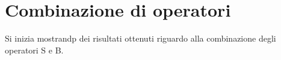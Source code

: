 \chapter{Combinazione di operatori}
Si inizia mostrandp dei risultati ottenuti\cite{bouvel2022preimages} riguardo alla combinazione degli operatori S e B.